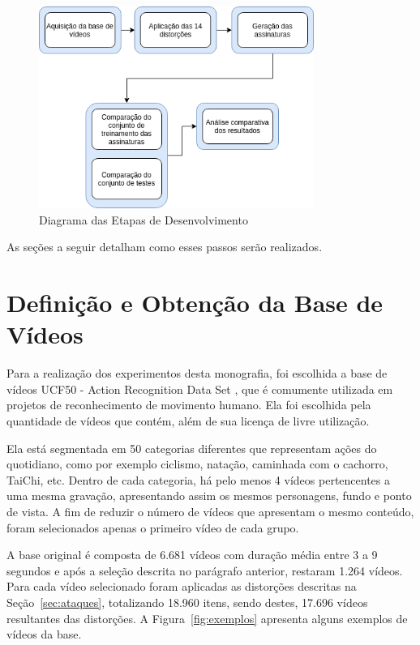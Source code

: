 \begin{figure}[h]
    \centering
    \caption{Diagrama das Etapas de Desenvolvimento}
    \label{dia:metodologia}
    \includegraphics[width=0.8\textwidth]{dados/figuras/Metodologia}
\end{figure}

As seções a seguir detalham como esses passos serão realizados.

\section{Definição e Obtenção da Base de Vídeos}
\label{sec:database}

Para a realização dos experimentos desta monografia, foi escolhida a base de vídeos UCF50 - Action Recognition Data Set \citeauthor{reddy2013recognizing}, que é comumente utilizada em projetos de reconhecimento de movimento humano. Ela foi escolhida pela quantidade de vídeos que contém, além de sua licença de livre utilização.

Ela está segmentada em 50 categorias diferentes que representam ações do quotidiano, como por exemplo ciclismo, natação, caminhada com o cachorro, TaiChi, etc. Dentro de cada categoria, há pelo menos 4 vídeos pertencentes a uma mesma gravação, apresentando assim os mesmos personagens, fundo e ponto de vista. A fim de reduzir o número de vídeos que apresentam o mesmo conteúdo, foram selecionados apenas o primeiro vídeo de cada grupo.

A base original é composta de 6.681 vídeos com duração média entre 3 a 9 segundos e após a seleção descrita no parágrafo anterior, restaram 1.264 vídeos. Para cada vídeo selecionado foram aplicadas as distorções descritas na Seção~\ref{sec:ataques}, totalizando 18.960 itens, sendo destes, 17.696 vídeos resultantes das distorções. A Figura~\ref{fig:exemplos} apresenta alguns exemplos de vídeos da base.

